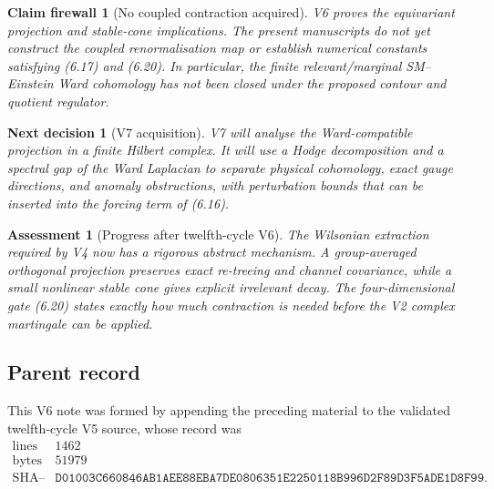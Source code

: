 \documentclass[11pt]{article}
\newtheorem{firewall}[theorem]{Claim firewall}
\newtheorem{decision}[theorem]{Next decision}
\newtheorem{assessment}[theorem]{Assessment}
\theoremstyle{remark}
\begin{document}
\begin{firewall}[No coupled contraction acquired]
\label{fire:v12v6-boundary}
V6 proves the equivariant projection and stable-cone implications.
The present manuscripts do not yet construct the coupled
renormalisation map or establish numerical constants satisfying
(6.17) and (6.20).  In particular, the finite relevant/marginal
SM--Einstein Ward cohomology has not been closed under the proposed
contour and quotient regulator.
\end{firewall}

\begin{decision}[V7 acquisition]
\label{dec:v12v6-next}
V7 will analyse the Ward-compatible projection in a finite Hilbert
complex.  It will use a Hodge decomposition and a spectral gap of the
Ward Laplacian to separate physical cohomology, exact gauge
directions, and anomaly obstructions, with perturbation bounds that
can be inserted into the forcing term of (6.16).
\end{decision}

\begin{assessment}[Progress after twelfth-cycle V6]
\label{ass:v12v6-status}
The Wilsonian extraction required by V4 now has a rigorous abstract
mechanism.  A group-averaged orthogonal projection preserves exact
re-treeing and channel covariance, while a small nonlinear stable
cone gives explicit irrelevant decay.  The four-dimensional gate
(6.20) states exactly how much contraction is needed before the V2
complex martingale can be applied.
\end{assessment}

\subsection{Parent record}

This V6 note was formed by appending the preceding material to the
validated twelfth-cycle V5 source, whose record was
\[
\begin{array}{c|c}
\text{lines}&1462\\
\text{bytes}&51979\\
\text{SHA--256}&
\texttt{D01003C660846AB1AEE88EBA7DE0806351E2250118B996D2F89D3F5ADE1D8F99}.
\end{array}                                                     \tag{6.23}
\]

\end{document}

